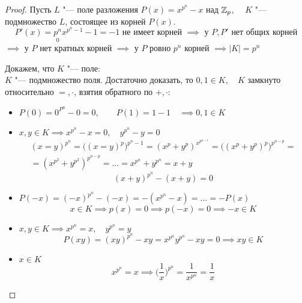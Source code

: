 \begin{proof}
	Пусть $ L $ "--- поле разложения $ P(x) = x^{p^n} - x $ над $ \mathbb{Z}_p $, $ \quad K $ "--- подмножество $ L $, состоящее из корней $ P(x) $.
	$$ P'(x) = \underset0{p^n}x^{p^n - 1} - 1 = -1 \text{ не имеет корней } \implies \text{ у } P, P' \text{ нет общих корней} $$
	$ \implies $ у $ P $ нет кратных корней $ \implies $ у $ P $ ровно $ p^n $ корней $ \implies |K| = p^n $

	Докажем, что $ K $ "--- поле: \\
	$ K $ "--- подмножество поля. Достаточно доказать, то $ 0, 1 \in K, \quad K $ замкнуто относительно $ =, \cdot $, взятия обратного по $ +, \cdot $:
	\begin{itemize}
		\item $ P(0) = 0^{P^n} - 0 = 0, \qquad P(1) = 1 - 1 \quad \implies 0, 1 \in K $
		\item $ x, y \in K \implies x^{p^n} - x = 0, \quad y^{p^n} - y = 0 $
		\begin{multline*}
			(x = y)^{p^n} = \bigg( (x = y)^p \bigg)^{p^n - 1} = (x^p + y^p)^{x^{p^{n - 1}}} = \bigg( (x^p + y^p)^p \bigg)^{p^{n - p}} = \\
			= (x^{p^2} + y^{p^2})^{p^{n - p}} = \dots = x^{p^n} + y^{p^n} = x + y
		\end{multline*}
		$$ (x + y)^{p^n} - (x + y) = 0 $$
		\item $ P(-x) = (-x)^{p^n} - (-x) = -(x^{p^n} - x) = \dots = -P(x) $
		$$ x \in K \implies p(x) = 0 \implies p (-x) = 0 \implies -x \in K $$
		\item $ x, y \in K \implies x^{p^n} = x, \quad y^{p^n} = y $
		$$ P(xy) = (xy)^{p^n} - xy = x^{p^n}y^{p^n} - xy = 0 \implies xy \in K $$
		\item $ x \in K $
		$$ x^{p^n} = x \implies \bigg( \frac1x \bigg)^{p^n} = \frac1{x^{p^n}} = \frac1x $$
	\end{itemize}
\end{proof}
